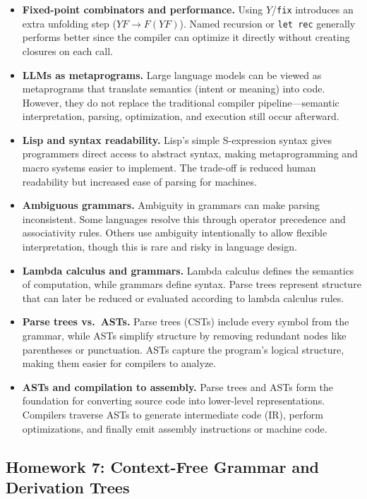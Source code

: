 \documentclass{article}
\theoremstyle{theorem}
\theoremstyle{definition}
\theoremstyle{remark}
\begin{document}
\begin{itemize}
  \item \textbf{Fixed-point combinators and performance.} Using $Y$/\texttt{fix} introduces an extra unfolding step ($YF \to F(YF)$). Named recursion or \texttt{let rec} generally performs better since the compiler can optimize it directly without creating closures on each call.
  \item \textbf{LLMs as metaprograms.} Large language models can be viewed as metaprograms that translate semantics (intent or meaning) into code. However, they do not replace the traditional compiler pipeline—semantic interpretation, parsing, optimization, and execution still occur afterward.
  \item \textbf{Lisp and syntax readability.} Lisp’s simple S-expression syntax gives programmers direct access to abstract syntax, making metaprogramming and macro systems easier to implement. The trade-off is reduced human readability but increased ease of parsing for machines.
  \item \textbf{Ambiguous grammars.} Ambiguity in grammars can make parsing inconsistent. Some languages resolve this through operator precedence and associativity rules. Others use ambiguity intentionally to allow flexible interpretation, though this is rare and risky in language design.
  \item \textbf{Lambda calculus and grammars.} Lambda calculus defines the semantics of computation, while grammars define syntax. Parse trees represent structure that can later be reduced or evaluated according to lambda calculus rules.
  \item \textbf{Parse trees vs.\ ASTs.} Parse trees (CSTs) include every symbol from the grammar, while ASTs simplify structure by removing redundant nodes like parentheses or punctuation. ASTs capture the program’s logical structure, making them easier for compilers to analyze.
  \item \textbf{ASTs and compilation to assembly.} Parse trees and ASTs form the foundation for converting source code into lower-level representations. Compilers traverse ASTs to generate intermediate code (IR), perform optimizations, and finally emit assembly instructions or machine code.
\end{itemize}

\subsection{Homework 7: Context-Free Grammar and Derivation Trees}
\end{document}
